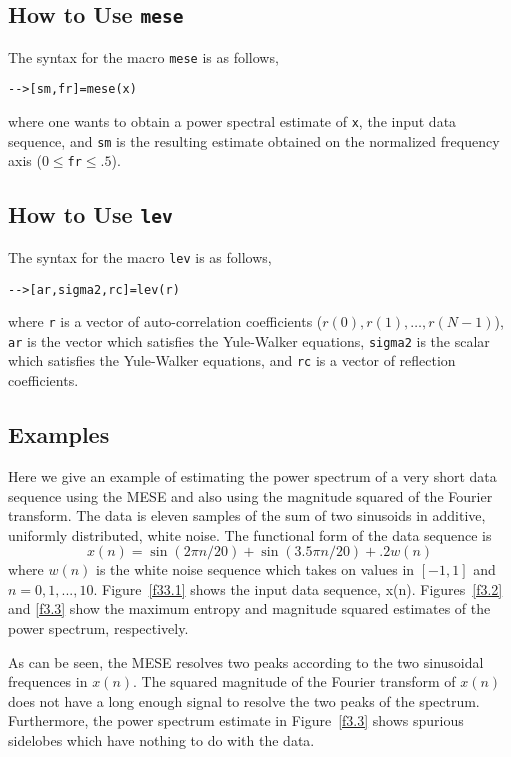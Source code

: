 \subsection{How to Use {\tt mese}}

	The syntax for the macro {\tt mese} is as follows,
\begin{verbatim}
-->[sm,fr]=mese(x)
\end{verbatim}
where one wants to obtain a power spectral estimate of
{\tt x}, the input data sequence, and {\tt sm} is the resulting
estimate obtained on the normalized frequency axis ($0\le${\tt fr}$\le .5$).

\subsection{How to Use {\tt lev}}

	The syntax for the macro {\tt lev} is as follows,
\begin{verbatim}
-->[ar,sigma2,rc]=lev(r)
\end{verbatim}
where {\tt r} is a vector of auto-correlation coefficients ($r(0),r(1),
\ldots,r(N-1)$), {\tt ar} is the vector which satisfies the Yule-Walker
equations, {\tt sigma2} is the scalar which satisfies the Yule-Walker
equations, and {\tt rc} is a vector of reflection coefficients.

\subsection{Examples}

	Here we give an example of estimating the power spectrum of 
a very short data sequence using the MESE and also using the magnitude
squared of the Fourier transform.  The data is eleven
samples of the sum of two 
sinusoids in additive, uniformly distributed, white noise.  The functional
form of the data sequence is
%
\begin{equation}
x(n)=\sin(2\pi n/20)+\sin(3.5\pi n/20)+.2w(n)
\end{equation}
%
where $w(n)$ is the white noise sequence which takes on values in $[-1,1]$
and $n=0,1,...,10$.  Figure~\ref{f33.1} shows the input data sequence, x(n).
Figures~\ref{f3.2} and \ref{f3.3} show the maximum entropy and magnitude
squared estimates of the power spectrum, respectively.
%

%
%

%

%
As can be seen, the MESE resolves two peaks according to the 
two sinusoidal frequences in $x(n)$.  The squared magnitude of
the Fourier transform of $x(n)$ does not have a long enough signal
to resolve the two peaks of the spectrum.  Furthermore, the
power spectrum estimate in Figure~\ref{f3.3} shows spurious sidelobes
which have nothing to do with the data.


